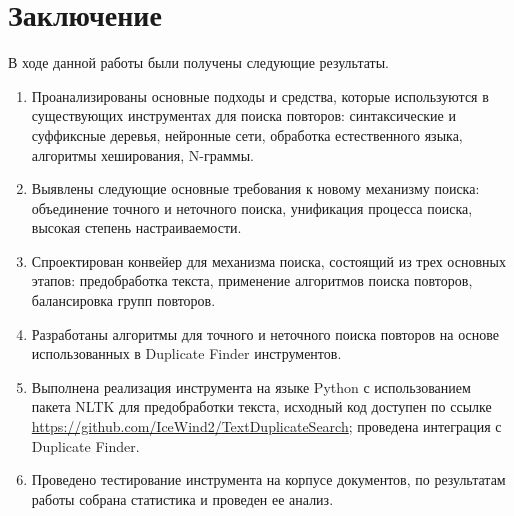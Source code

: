 \documentclass[14pt]{matmex-diploma-custom}
\begin{document}
\section*{Заключение}
В ходе данной работы были получены следующие результаты.
\begin{enumerate}
   	\item Проанализированы основные подходы и средства, которые используются в существующих инструментах для поиска повторов: синтаксические и суффиксные деревья, нейронные сети, обработка естественного языка, алгоритмы хеширования, N-граммы.
   	\item Выявлены следующие основные требования к новому механизму поиска: объединение точного и неточного поиска, унификация процесса поиска, высокая степень настраиваемости.
   	\item Спроектирован конвейер для механизма поиска, состоящий из трех основных этапов: предобработка текста, применение алгоритмов поиска повторов, балансировка групп повторов.
   	\item Разработаны алгоритмы для точного и неточного поиска повторов на основе использованных в Duplicate Finder инструментов.
   	\item Выполнена реализация инструмента на языке Python с использованием пакета NLTK для предобработки текста, исходный код доступен по ссылке \mbox{\url{https://github.com/IceWind2/TextDuplicateSearch}}; проведена интеграция с Duplicate Finder.
   	\item Проведено тестирование инструмента на корпусе документов, по результатам работы собрана статистика и проведен ее анализ.
\end{enumerate}


\setmonofont[Mapping=tex-text]{CMU Typewriter Text}


\end{document}
